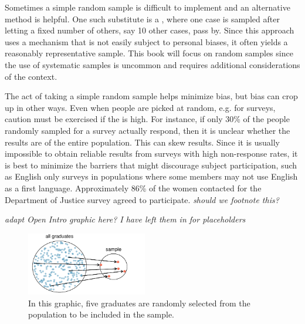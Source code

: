 \begin{doublespace}
Sometimes a simple random sample is difficult to implement and an alternative method is helpful. One such substitute is a , where one case is sampled after letting a fixed number of others, say 10 other cases, pass by. Since this approach uses a mechanism that is not easily subject to personal biases, it often yields a reasonably representative sample. This book will focus on random samples since the use of systematic samples is uncommon and requires additional considerations of the context.

The act of taking a simple random sample helps minimize bias, but bias can crop up in other
ways. Even when people are picked at random, e.g. for surveys, caution must be exercised if
the   is high. For instance, if only
30\% of the people randomly sampled for a survey actually respond, then it is unclear
whether the results are  of the entire population. This
  can skew results. Since it
is usually impossible to obtain reliable results from surveys with high non-response rates,
it is best to minimize the barriers that might discourage subject participation, such as
English only surveys in populations where some members may not use English as a first
language.  Approximately 86\% of the women contacted for the Department of Justice survey agreed to participate.  \textit{should we footnote this?}



\textit{adapt Open Intro graphic here?  I have left them in for placeholders}







\begin{figure}[ht]
\centering
\includegraphics[width=0.47\textwidth]{ch_intro_to_data_oi_biostat/figures/popToSample/popToSampleGraduates}
\caption{In this graphic, five graduates are randomly selected from the population to be included in the sample.}
\label{popToSampleGraduates}
\end{figure}




\end{doublespace}
